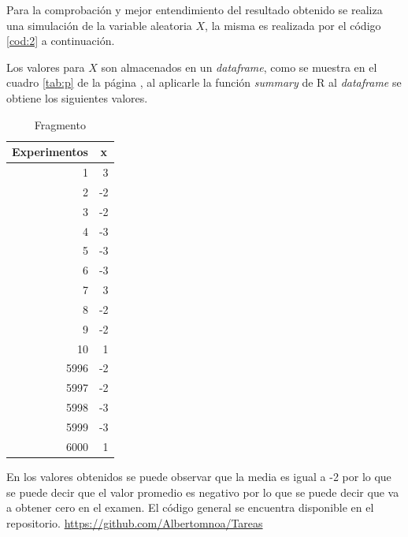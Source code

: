 \documentclass{article}
\begin{document}
Para la comprobación y mejor entendimiento del resultado obtenido se realiza una simulación de la variable aleatoria $X$, la misma es realizada por el código \ref{cod:2} a continuación.
\begin{center}

\label{cod:2}
\end{center}
Los valores para $X$ son almacenados en un \textit{dataframe}, como se muestra en el cuadro \ref{tab:p} de la página \pageref{tab:p}, al aplicarle la función \textit{summary} de R al \textit{dataframe} se obtiene los siguientes valores.  
\begin{table}[H]
  \centering
  \caption{Fragmento}
    \begin{tabular}{rr}
    \toprule
    \multicolumn{1}{l}{Experimentos} & \multicolumn{1}{c}{x} \\
    \midrule
    1     & 3 \\
    2     & -2 \\
    3     & -2 \\
    4     & -3 \\
    5     & -3 \\
    6     & -3 \\
    7     & 3 \\
    8     & -2 \\
    9     & -2 \\
    10    & 1 \\
    5996  & -2 \\
    5997  & -2 \\
    5998  & -3 \\
    5999  & -3 \\
    6000  & 1 \\
    \bottomrule
    \end{tabular}%
  \label{tab:addlabel}%
\end{table}%
En los valores obtenidos se puede observar que la media es igual a -2 por lo que se puede decir que el valor promedio es negativo por lo que se puede decir que va a obtener cero en el examen.
 El código general se encuentra disponible en el repositorio. \href{https://github.com/Albertomnoa/Tareas_MPA/tree/master/Tarea10}{https://github.com/Albertomnoa/Tareas} \textbf{} 

   
\newpage


\end{document}
